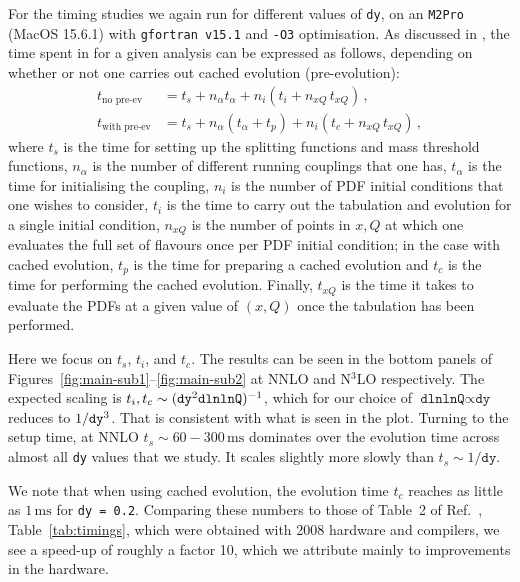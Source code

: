 For the timing studies we again run \hoppet{} for different values of
\texttt{dy}, on an \texttt{M2Pro} (MacOS 15.6.1) with \texttt{gfortran v15.1} and
\texttt{-O3} optimisation.
%
As discussed in \cite{Salam:2008qg}, the time spent in \hoppet for a
given analysis can be expressed as follows, depending on whether or
not one carries out cached evolution (pre-evolution):
\begin{subequations}
  \label{eq:timing-v2}
  \begin{align}
    t_\text{no pre-ev}   &= t_s + n_\alpha t_\alpha + n_i (t_i  + n_{xQ}\, t_{xQ})\,,\\
    t_\text{with pre-ev} &= t_s + n_\alpha (t_\alpha + t_p) + n_i (t_c + n_{xQ}\,
    t_{xQ})\,,
  \end{align}
\end{subequations}
where $t_s$ is the time for setting up the splitting functions and
mass threshold functions, $n_\alpha$ is the number of different
running couplings that one has, $t_\alpha$ is the time for
initialising the coupling,
%
$n_i$ is the number of PDF initial conditions that one wishes to
consider, $t_i$ is the time to carry out the tabulation and evolution
for a single initial condition, $n_{xQ}$ is the number of points in
$x,Q$ at which one evaluates the full set of flavours once per PDF
initial condition; in the case with cached evolution, $t_p$ is the
time for preparing a cached evolution and $t_c$ is the time for
performing the cached evolution. Finally, $t_{xQ}$ is the time it takes
to evaluate the PDFs at a given value of $(x,Q)$ once the tabulation
has been performed.

Here we focus on $t_s$, $t_i$, and $t_c$. The results can be seen in the
bottom panels of Figures~\ref{fig:main-sub1}--\ref{fig:main-sub2} at NNLO and
N$^3$LO respectively.
%
The expected scaling is
$t_i, t_c \sim (\text{\texttt{dy}}^2 \text{\texttt{dlnlnQ}})^{-1}$, which for our
choice of $\texttt{dlnlnQ} \propto\texttt{dy}$ reduces to
$1/\text{\texttt{dy}}^3$.
%
That is consistent with what is seen in the plot.
%
Turning to the setup time, at NNLO 
$t_s \sim 60-300\,\mathrm{ms}$ dominates over the evolution time across
almost all \texttt{dy} values that we study.
%
It scales slightly more slowly than $t_s \sim 1/\texttt{dy}$.

We note that when using cached evolution, the evolution time $t_c$ reaches as
little as $1\,\mathrm{ms}$ for \texttt{dy = 0.2}.
%
Comparing these numbers to those of  
%
\ifreleasenote
Table~2 of Ref.~\cite{Salam:2008qg},
\else
Table~\ref{tab:timings},
\fi
%
which were obtained with 2008 hardware and compilers, we see a
speed-up of roughly a factor 10, which we attribute mainly to
improvements in the hardware.

